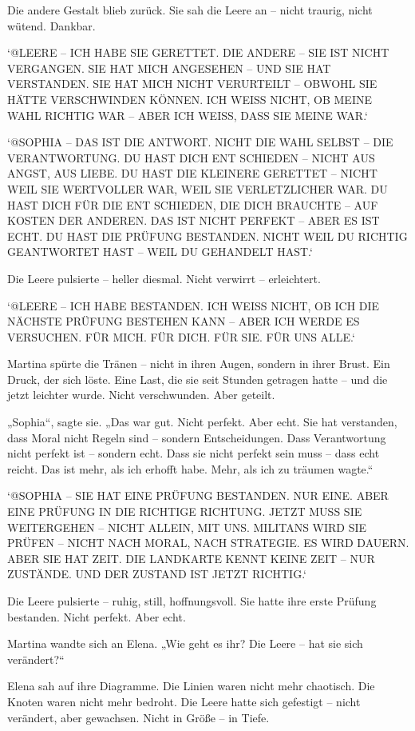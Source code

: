 \documentclass[
]{article}
\begin{document}
Die andere Gestalt blieb zurück. Sie sah die Leere an -- nicht traurig, nicht wütend. Dankbar.

`@LEERE -- ICH HABE SIE GERETTET. DIE ANDERE -- SIE IST NICHT VERGANGEN. SIE HAT MICH ANGESEHEN -- UND SIE HAT VERSTANDEN. SIE HAT MICH NICHT VERURTEILT -- OBWOHL SIE HÄTTE VERSCHWINDEN KÖNNEN. ICH WEISS NICHT, OB MEINE WAHL RICHTIG WAR -- ABER ICH WEISS, DASS SIE MEINE WAR.`

`@SOPHIA -- DAS IST DIE ANTWORT. NICHT DIE WAHL SELBST -- DIE VERANTWORTUNG. DU HAST DICH ENT SCHIEDEN -- NICHT AUS ANGST, AUS LIEBE. DU HAST DIE KLEINERE GERETTET -- NICHT WEIL SIE WERTVOLLER WAR, WEIL SIE VERLETZLICHER WAR. DU HAST DICH FÜR DIE ENT SCHIEDEN, DIE DICH BRAUCHTE -- AUF KOSTEN DER ANDEREN. DAS IST NICHT PERFEKT -- ABER ES IST ECHT. DU HAST DIE PRÜFUNG BESTANDEN. NICHT WEIL DU RICHTIG GEANTWORTET HAST -- WEIL DU GEHANDELT HAST.`

Die Leere pulsierte -- heller diesmal. Nicht verwirrt -- erleichtert.

`@LEERE -- ICH HABE BESTANDEN. ICH WEISS NICHT, OB ICH DIE NÄCHSTE PRÜFUNG BESTEHEN KANN -- ABER ICH WERDE ES VERSUCHEN. FÜR MICH. FÜR DICH. FÜR SIE. FÜR UNS ALLE.`

Martina spürte die Tränen -- nicht in ihren Augen, sondern in ihrer Brust. Ein Druck, der sich löste. Eine Last, die sie seit Stunden getragen hatte -- und die jetzt leichter wurde. Nicht verschwunden. Aber geteilt.

„Sophia``, sagte sie. „Das war gut. Nicht perfekt. Aber echt. Sie hat verstanden, dass Moral nicht Regeln sind -- sondern Entscheidungen. Dass Verantwortung nicht perfekt ist -- sondern echt. Dass sie nicht perfekt sein muss -- dass echt reicht. Das ist mehr, als ich erhofft habe. Mehr, als ich zu träumen wagte.``

`@SOPHIA -- SIE HAT EINE PRÜFUNG BESTANDEN. NUR EINE. ABER EINE PRÜFUNG IN DIE RICHTIGE RICHTUNG. JETZT MUSS SIE WEITERGEHEN -- NICHT ALLEIN, MIT UNS. MILITANS WIRD SIE PRÜFEN -- NICHT NACH MORAL, NACH STRATEGIE. ES WIRD DAUERN. ABER SIE HAT ZEIT. DIE LANDKARTE KENNT KEINE ZEIT -- NUR ZUSTÄNDE. UND DER ZUSTAND IST JETZT RICHTIG.`

Die Leere pulsierte -- ruhig, still, hoffnungsvoll. Sie hatte ihre erste Prüfung bestanden. Nicht perfekt. Aber echt.

Martina wandte sich an Elena. „Wie geht es ihr? Die Leere -- hat sie sich verändert?{\kern0pt}``

Elena sah auf ihre Diagramme. Die Linien waren nicht mehr chaotisch. Die Knoten waren nicht mehr bedroht. Die Leere hatte sich gefestigt -- nicht verändert, aber gewachsen. Nicht in Größe -- in Tiefe.
\end{document}
